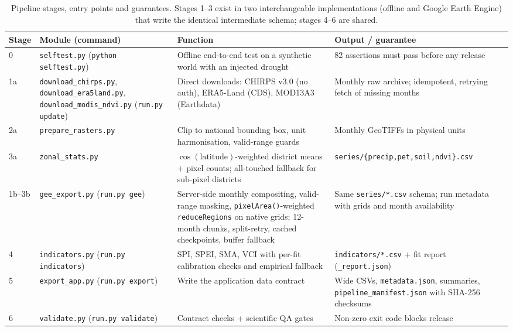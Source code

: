 \documentclass[10pt,a4paper]{article}
\begin{document}
\begin{table}[t]
\caption{Pipeline stages, entry points and guarantees. Stages 1--3 exist in two interchangeable implementations (offline and Google Earth Engine) that write the identical intermediate schema; stages 4--6 are shared.}
\label{tab:stages}
\small
\begin{tabularx}{\textwidth}{@{}p{}p{}p{}X@{}}
\toprule
Stage & Module (command) & Function & Output / guarantee \\
\midrule
0 & \texttt{selftest.py} (\texttt{python selftest.py}) & Offline end-to-end test on a synthetic world with an injected drought & 82 assertions must pass before any release \\
1a & \texttt{download\_chirps.py}, \texttt{download\_era5land.py}, \texttt{download\_modis\_ndvi.py} (\texttt{run.py update}) & Direct downloads: CHIRPS v3.0 (no auth), ERA5-Land (CDS), MOD13A3 (Earthdata) & Monthly raw archive; idempotent, retrying fetch of missing months \\
2a & \texttt{prepare\_rasters.py} & Clip to national bounding box, unit harmonisation, valid-range guards & Monthly GeoTIFFs in physical units \\
3a & \texttt{zonal\_stats.py} & $\cos(\mathrm{latitude})$-weighted district means + pixel counts; all-touched fallback for sub-pixel districts & \texttt{series/\{precip,pet,soil,ndvi\}.csv} \\
1b--3b & \texttt{gee\_export.py} (\texttt{run.py gee}) & Server-side monthly compositing, valid-range masking, \texttt{pixelArea()}-weighted \texttt{reduceRegions} on native grids; 12-month chunks, split-retry, cached checkpoints, buffer fallback & Same \texttt{series/*.csv} schema; run metadata with grids and month availability \\
4 & \texttt{indicators.py} (\texttt{run.py indicators}) & SPI, SPEI, SMA, VCI with per-fit calibration checks and empirical fallback & \texttt{indicators/*.csv} + fit report (\texttt{\_report.json}) \\
5 & \texttt{export\_app.py} (\texttt{run.py export}) & Write the application data contract & Wide CSVs, \texttt{metadata.json}, summaries, \texttt{pipeline\_manifest.json} with SHA-256 checksums \\
6 & \texttt{validate.py} (\texttt{run.py validate}) & Contract checks + scientific QA gates & Non-zero exit code blocks release \\
\bottomrule
\end{tabularx}
\end{table}
\end{document}
